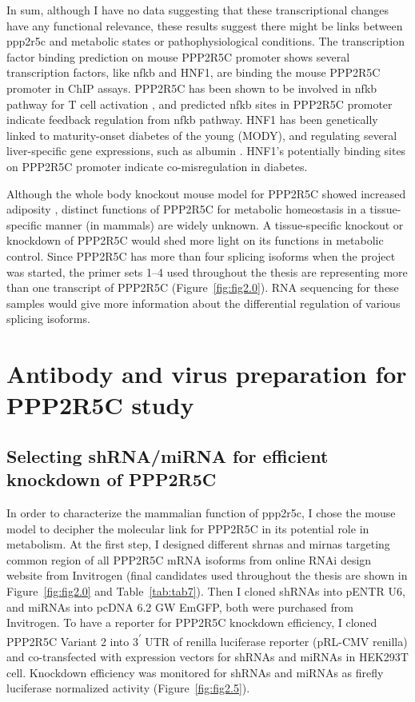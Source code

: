 In sum, although I have no data suggesting that these transcriptional changes have any functional relevance, these results suggest there might be links between \gls{ppp2r5c} and metabolic states or pathophysiological conditions. The transcription factor binding prediction \cite{_sabiosciences_????} on mouse PPP2R5C promoter shows several transcription factors, like \gls{nfkb} and HNF1\textalpha{}, are binding the mouse PPP2R5C promoter in ChIP assays. PPP2R5C has been shown to be involved in \gls{nfkb} pathway for T cell activation \cite{breuer_protein_2014}, and predicted \gls{nfkb} sites in PPP2R5C promoter indicate feedback regulation from \gls{nfkb} pathway. HNF1\textalpha{} has been genetically linked to maturity-onset diabetes of the young (MODY), and regulating several liver-specific gene expressions, such as albumin \cite{owen_monogenic_2013}. HNF1\textalpha{}'s potentially binding sites on PPP2R5C promoter indicate co-misregulation in diabetes.  

Although the whole body knockout mouse model for PPP2R5C showed increased adiposity \cite{varadkar_protein_2014}, distinct functions of PPP2R5C for metabolic homeostasis in a tissue-specific manner (in mammals) are widely unknown. A tissue-specific knockout or knockdown of PPP2R5C would shed more light on its functions in metabolic control. Since PPP2R5C has more than four splicing isoforms when the project was started, the primer sets 1--4 used throughout the thesis are representing more than one transcript of PPP2R5C (Figure~\ref{fig:fig2.0}). RNA sequencing for these samples would give more information about the differential regulation of various splicing isoforms.

\section{Antibody and virus preparation for PPP2R5C study}

\subsection{Selecting shRNA/miRNA for efficient knockdown of PPP2R5C}

In order to characterize the mammalian function of \gls{ppp2r5c},  I chose the mouse model  to decipher the molecular link for PPP2R5C in its potential role in metabolism. At the first step, I designed different \gls{shrna}s and \gls{mirna}s targeting common region of all PPP2R5C mRNA isoforms from online RNAi design website from Invitrogen \cite{_invitrogen_2014} (final candidates used throughout the thesis are shown in Figure~\ref{fig:fig2.0} and Table~\ref{tab:tab7}). Then I cloned shRNAs into pENTR U6, and miRNAs into pcDNA 6.2 GW EmGFP, both were purchased from Invitrogen. To have a reporter for PPP2R5C knockdown efficiency, I cloned PPP2R5C Variant 2 into 3\textsuperscript{$\prime$} UTR of renilla luciferase reporter (pRL-CMV renilla) and co-transfected with expression vectors for shRNAs and miRNAs in HEK293T cell. Knockdown efficiency was monitored for shRNAs and miRNAs as firefly luciferase normalized activity (Figure~\ref{fig:fig2.5}). 

